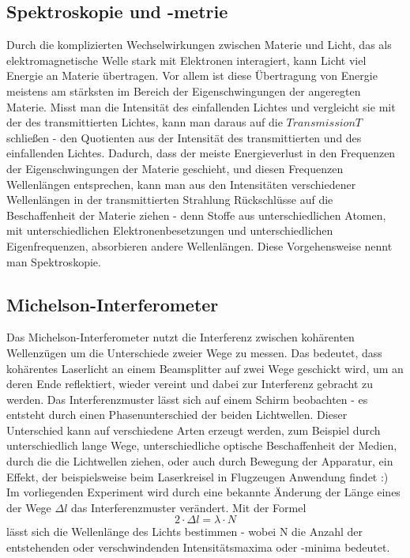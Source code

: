 \documentclass{article}
\begin{document}
\subsection{Spektroskopie und -metrie}
Durch die komplizierten Wechselwirkungen zwischen Materie und Licht, das als elektromagnetische Welle stark mit Elektronen interagiert, kann Licht viel Energie an Materie übertragen. Vor allem ist diese Übertragung von Energie meistens am stärksten im Bereich der Eigenschwingungen der angeregten Materie. Misst man die Intensität des einfallenden Lichtes und vergleicht sie mit der des transmittierten Lichtes, kann man daraus auf die $Transmission T$ schließen - den Quotienten aus der Intensität des transmittierten und des einfallenden Lichtes. Dadurch, dass der meiste Energieverlust in den Frequenzen der Eigenschwingungen der Materie geschieht, und diesen Frequenzen Wellenlängen entsprechen, kann man aus den Intensitäten verschiedener Wellenlängen in der transmittierten Strahlung Rückschlüsse auf die Beschaffenheit der Materie ziehen - denn Stoffe aus unterschiedlichen Atomen, mit unterschiedlichen Elektronenbesetzungen und unterschiedlichen Eigenfrequenzen, absorbieren andere Wellenlängen. Diese Vorgehensweise nennt man Spektroskopie. 

\subsection{Michelson-Interferometer}

Das Michelson-Interferometer nutzt die Interferenz zwischen kohärenten Wellenzügen um die Unterschiede zweier Wege zu messen. Das bedeutet, dass kohärentes Laserlicht an einem Beamsplitter auf zwei Wege geschickt wird, um an deren Ende reflektiert, wieder vereint und dabei zur Interferenz gebracht zu werden. Das Interferenzmuster lässt sich auf einem Schirm beobachten - es entsteht durch einen Phasenunterschied der beiden Lichtwellen. Dieser Unterschied kann auf verschiedene Arten erzeugt werden, zum Beispiel durch unterschiedlich lange Wege, unterschiedliche optische Beschaffenheit der Medien, durch die die Lichtwellen ziehen, oder auch durch Bewegung der Apparatur, ein Effekt, der beispielsweise beim Laserkreisel in Flugzeugen Anwendung findet :)\\
Im vorliegenden Experiment wird durch eine bekannte Änderung der Länge eines der Wege $\Delta l$ das Interferenzmuster verändert. Mit der Formel 
\begin{equation}
\label{equ:Michelson}
2\cdot \Delta l= \lambda \cdot N
\end{equation}
lässt sich die Wellenlänge des Lichts bestimmen - wobei N die Anzahl der entstehenden oder verschwindenden Intensitätsmaxima oder -minima bedeutet. 
\end{document}
